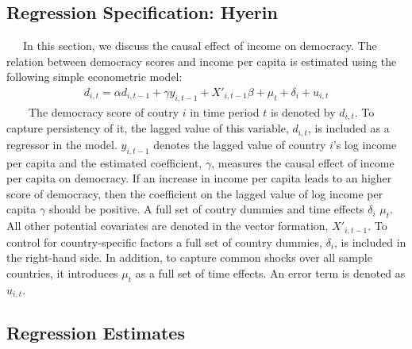 \subsection{Regression Specification: Hyerin}
\ \ \ In this section, we discuss the causal effect of income on democracy. The relation between democracy scores and income per capita is estimated using the following simple econometric model:  
\begin{align}
d_{i,t} = \alpha d_{i,t-1} + \gamma y_{i,t-1}+ X'_{i,t-1}\beta + \mu_{t}+\delta_{i} + u_{i,t}
\end{align}
\ \ \ \ The democracy score of coutry $i$ in time period $t$ is denoted by $d_{i,t}$. To capture persistency of it, the lagged value of this variable, $d_{i,t}$, is included as a regressor in the model. $y_{i,t-1}$ denotes the lagged value of country $i$'s log income per capita and the estimated coefficient, $\gamma$, measures the causal effect of income per capita on democracy. If an increase in income per capita leads to an higher score of democracy, then the coefficient on the lagged value of log income per capita $\gamma$ should be positive. A full set of coutry dummies and time effects   $\delta_{i}$ $\mu_{t}$. All other potential covariates are denoted in the vector formation,  $X'_{i,t-1}$. To control for country-specific factors a full set of country dummies, $\delta_{i}$, is included in the right-hand side. In addition, to capture common shocks over all sample countries, it introduces $\mu_{t}$ as a full set of time effects. An error term is denoted as $u_{i,t}$.\\


\subsection{Regression Estimates}
